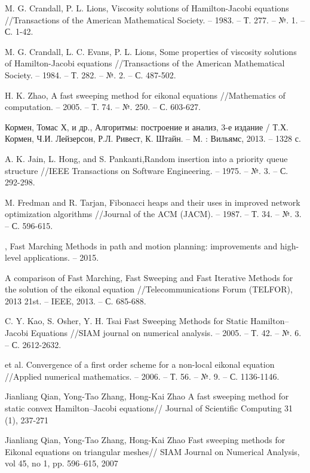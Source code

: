 \begin{thebibliography}{99}
 {M. G. Crandall, P. L. Lions}, Viscosity solutions of
  Hamilton-Jacobi equations //Transactions of the American
  Mathematical Society. – 1983. – Т. 277. – №. 1. – С. 1-42.

 {M. G. Crandall, L. C. Evans, P. L. Lions}, Some
  properties of viscosity solutions of Hamilton-Jacobi equations
  //Transactions of the American Mathematical Society. – 1984. –
  Т. 282. – №. 2. – С. 487-502.

  
 {H. K. Zhao}, A fast sweeping method for eikonal
  equations //Mathematics of computation. – 2005. – Т. 74. – №. 250. –
  С. 603-627.

 {Кормен, Томас Х, и др.}, Алгоритмы: построение и
  анализ, 3-е издание / Т.Х. Кормен, Ч.И. Лейзерсон, Р.Л. Ривест,
  К. Штайн. – М. : Вильямс, 2013. – 1328 с.

 {A. K. Jain, L. Hong, and S. Pankanti},Random
  insertion into a priority queue structure //IEEE Transactions on
  Software Engineering. – 1975. – №. 3. – С. 292-298.


 {M. Fredman and R. Tarjan}, Fibonacci heaps and their
  uses in improved network optimization algorithms //Journal of the
  ACM (JACM). – 1987. – Т. 34. – №. 3. – С. 596-615.

  
, Fast Marching Methods in
  path and motion planning: improvements and high-level
  applications. – 2015.

 A comparison of Fast Marching,
  Fast Sweeping and Fast Iterative Methods for the solution of the
  eikonal equation //Telecommunications Forum (TELFOR), 2013 21st. –
  IEEE, 2013. – С. 685-688.
  
 {C. Y. Kao, S. Osher, Y. H. Tsai} Fast Sweeping
  Methods for Static Hamilton--Jacobi Equations //SIAM journal on
  numerical analysis. – 2005. – Т. 42. – №. 6. – С. 2612-2632.

 et al. Convergence of a first order
  scheme for a non-local eikonal equation //Applied numerical
  mathematics. – 2006. – Т. 56. – №. 9. – С. 1136-1146.
  
 {Jianliang Qian, Yong-Tao Zhang, Hong-Kai Zhao} A
  fast sweeping method for static convex Hamilton–Jacobi equations//
  Journal of Scientific Computing 31 (1), 237-271
  
 {Jianliang Qian, Yong-Tao Zhang, Hong-Kai Zhao} Fast
  sweeping methods for Eikonal equations on triangular meshes// SIAM
  Journal on Numerical Analysis, vol 45, no 1, pp. 596–615, 2007


\end{thebibliography}

